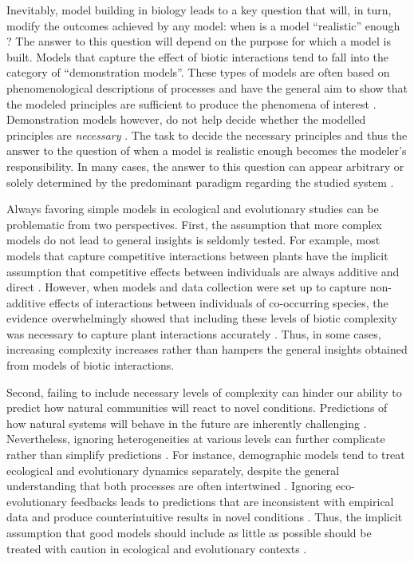 \documentclass[12pt]{article}
\begin{document}
Inevitably, model building in biology leads to a key question that will, in turn, modify the outcomes achieved by any model: when is a model ``realistic'' enough \citep{stouffer2019all}? The answer to this question will depend on the purpose for which a model is built. Models that capture the effect of biotic interactions tend to fall into the category of ``demonstration models''. These types of models are often based on phenomenological descriptions of processes and have the general aim to show that the modeled principles are sufficient to produce the phenomena of interest \citep{evans2013simple}.  Demonstration models however, do not help decide whether the modelled principles are \textit{necessary} \citep{evans2013simple}. The task to decide the necessary principles and thus the answer to the question of when a model is realistic enough becomes the modeler's responsibility. In many cases, the answer to this question can appear arbitrary or solely determined by the predominant paradigm regarding the studied system \citep{holland2006comment,bascompte2006response,kokko2007ecogenetic,aladwani2019addition,mayfield2017higher,martyn2021identifying}.



Always favoring simple models in ecological and evolutionary studies can be problematic from two perspectives. First, the assumption that more complex models do not lead to general insights is seldomly tested. For example, most models that capture competitive interactions between plants have the implicit assumption that competitive effects between individuals are always additive and direct \citep{schoener1974some,freckleton2001predicting,kraft2015plant}.  However, when models and data collection were set up to capture non-additive effects of interactions between individuals of co-occurring species, the evidence overwhelmingly showed that including these levels of biotic complexity was necessary to capture plant interactions accurately \citep{mayfield2017higher,martyn2021identifying,lai2021non}.  Thus, in some cases, increasing complexity increases rather than hampers the general insights obtained from models of biotic interactions.

Second, failing to include necessary levels of complexity can hinder our ability to predict how natural communities will react to novel conditions. Predictions of how natural systems will behave in the future are inherently challenging \citep{sutherland2006predicting}. Nevertheless, ignoring heterogeneities at various levels can further complicate rather than simplify predictions  \citep{evans2012predictive}. For instance, demographic models tend to treat ecological and evolutionary dynamics separately, despite the general understanding that both processes are often intertwined \citep{macarthur1962some,kokko2007ecogenetic}. Ignoring eco-evolutionary feedbacks leads to predictions that are inconsistent with empirical data and produce counterintuitive results in novel conditions \citep{kokko2007ecogenetic}. Thus, the implicit assumption that good models should include as little as possible should be treated with caution in ecological and evolutionary contexts \citep{evans2013simple, kokko2007ecogenetic,abrams2001describing}.
\end{document}

